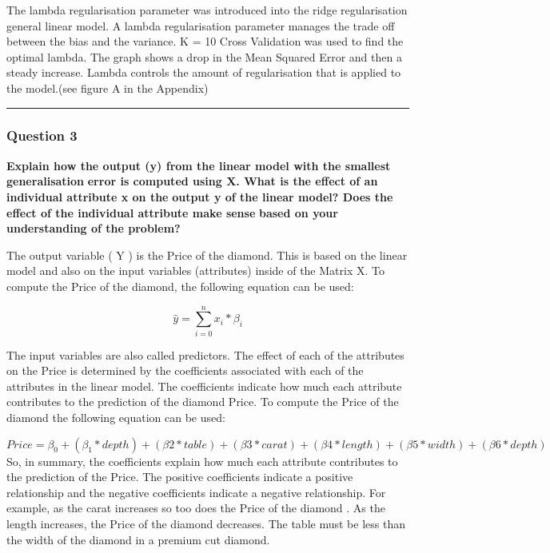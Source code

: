 \documentclass[
]{article}
\begin{document}
The lambda regularisation parameter was introduced into the ridge
regularisation general linear model. A lambda regularisation parameter
manages the trade off between the bias and the variance. K = 10 Cross
Validation was used to find the optimal lambda. The graph shows a drop
in the Mean Squared Error and then a steady increase. Lambda controls
the amount of regularisation that is applied to the model.(see figure A
in the Appendix)

\begin{center}\rule{0.5\linewidth}{0.5pt}\end{center}

\hypertarget{question-3}{%
\subsubsection{Question 3}\label{question-3}}

\textbf{Explain how the output (y) from the linear model with the
smallest generalisation} \textbf{error is computed using X. What is the
effect of an individual attribute x on the} \textbf{output y of the
linear model? Does the effect of the individual attribute make sense}
\textbf{based on your understanding of the problem?}

The output variable ( Y ) is the Price of the diamond. This is based on
the linear model and also on the input variables (attributes) inside of
the Matrix X. To compute the Price of the diamond, the following
equation can be used:

\[\hat{y} =  \sum_{i = 0}^{n} x_{i} * \beta_{i}\]

The input variables are also called predictors. The effect of each of
the attributes on the Price is determined by the coefficients associated
with each of the attributes in the linear model. The coefficients
indicate how much each attribute contributes to the prediction of the
diamond Price. To compute the Price of the diamond the following
equation can be used:

\[ Price = \beta_{0} + (\beta_{1} * depth) + (\beta{2} * table)  + (\beta{3} * carat) + (\beta{4} * length ) + (\beta{5} * width ) + (\beta{6} * depth )\]
So, in summary, the coefficients explain how much each attribute
contributes to the prediction of the Price. The positive coefficients
indicate a positive relationship and the negative coefficients indicate
a negative relationship. For example, as the carat increases so too does
the Price of the diamond . As the length increases, the Price of the
diamond decreases. The table must be less than the width of the diamond
in a premium cut diamond.
\end{document}
